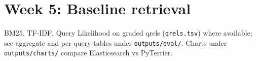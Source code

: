 \section{Week 5: Baseline retrieval}
BM25, TF-IDF, Query Likelihood on graded qrels (\texttt{qrels.tsv}) where available; see aggregate and per-query tables under \texttt{outputs/eval/}. Charts under \texttt{outputs/charts/} compare Elasticsearch vs PyTerrier.
